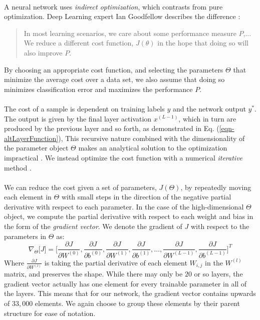 \documentclass[12pt,letterpaper]{article}
\begin{document}
\paragraph*{}A neural network uses \textit{indirect optimization}, which contrasts from pure optimization. Deep Learning expert Ian Goodfellow describes the difference \cite{Goodfellow}:
\begin{quote}
In most learning scenarios, we care about some performance measure $P$,... We reduce a different cost function, $J(\theta)$ in the hope that doing so will also improve $P$.
\end{quote}
By choosing an appropriate cost function, and selecting the parameters $\Theta$ that minimize the average cost over a data set, we also assume that doing so minimizes classification error and maximizes the performance $P$.

\paragraph*{}The cost of a sample is dependent on training labels $y$ and the network output $y^*$. The output is given by the final layer activation $x^{(L-1)}$, which in turn are produced by the previous layer and so forth, as demonstrated in Eq. (\ref{eqn-altLayerFunction}), This recursive nature combined with the dimensionality of the parameter object $\Theta$ makes an analytical solution to the optimization impractical \cite{Geron,Goodfellow,James}. We instead optimize the cost function with a numerical \textit{iterative} method \cite{Loy}. 

\paragraph*{}We can reduce the cost given a set of parameters, $J(\Theta)$, by repeatedly moving each element in $\Theta$ with small steps in the direction of the negative partial derivative with respect to each parameter. In the case of the high-dimensional $\Theta$ object, we compute the partial derivative with respect to each weight and bias in the form of the \textit{gradient vector}. We denote the gradient of $J$ with respect to the parameters in $\Theta$ as:
\begin{equation}
\label{eqn-CostGradient}
\nabla_{\Theta}\big[ J \big] = 
\Big[ 	\frac{\partial J}{\partial W^{(0)}}, \frac{\partial J}{\partial b^{(0)}}, 
		\frac{\partial J}{\partial W^{(1)}}, \frac{\partial J}{\partial b^{(1)}}, \hdots ,
		\frac{\partial J}{\partial W^{(L-1)}}, \frac{\partial J}{\partial b^{(L-1)}} \Big]^T
\end{equation}
Where $\frac{\partial J}{\partial W^{(l)}}$ is taking the partial derivative of each element $W_{i,j}$ in the $W^{(l)}$ matrix, and preserves the shape. While there may only be $20$ or so layers, the gradient vector actually has one element for every trainable parameter in all of the layers. This means that for our network, the gradient vector contains upwards of $33,000$ elements. We again choose to group these elements by their parent structure for ease of notation.
\end{document}
